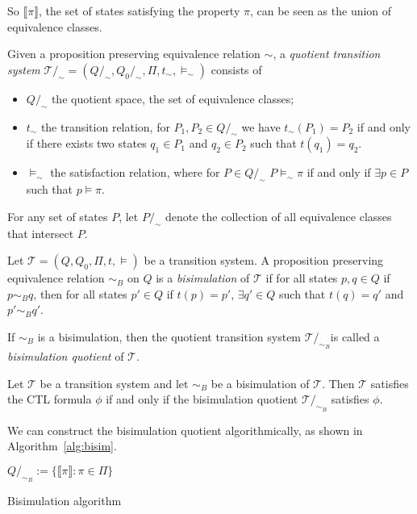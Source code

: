 So $\llbracket \pi\rrbracket$, the set of states satisfying the property $\pi$, can be seen as the union of equivalence classes.

\begin{defi}
Given a proposition preserving equivalence relation $\sim$, a \emph{quotient transition system} $\mathcal{T}/_{\sim}=(Q/_{\sim},Q_{0}/_{\sim},\Pi,t_{\sim},\models_{\sim})$ consists of
\begin{itemize}
\item{$Q/_{\sim}$ the quotient space, the set of equivalence classes;}
\item{$t_{\sim}$ the transition relation, for $P_{1},P_{2}\in Q/_{\sim}$ we have $t_{\sim}(P_{1})=P_{2}$ if and only if there exists two states $q_{1}\in P_{1}$ and $q_{2}\in P_{2}$ such that $t(q_{1})=q_{2}$.}
\item{$\models_{\sim}$ the satisfaction relation, where for $P\in Q/_{\sim}$ $P\models_{\sim}\pi$ if and only if $\exists p\in P$ such that $p\models \pi$.}
\end{itemize}
\end{defi}

For any set of states $P$, let $P/_{\sim}$ denote the collection of all equivalence classes that intersect $P$.

\begin{defi}
Let $\mathcal{T}=(Q,Q_{0},\Pi,t,\models)$ be a transition system. A proposition preserving equivalence relation $\sim_{B}$ on $Q$ is a \emph{bisimulation} of $\mathcal{T}$ if for all states $p,q\in Q$ if $p \sim_{B} q$, then for all states $p'\in Q$ if $t(p)=p'$, $\exists q'\in Q$ such that $t(q)=q'$ and $p'\sim_{B} q'$.
\end{defi}

If $\sim_{B}$ is a bisimulation, then the quotient transition system $\mathcal{T}/_{\sim_{B}}$is called a \emph{bisimulation quotient} of $\mathcal{T}$.

\begin{thm}
Let $\mathcal{T}$ be a transition system and let $\sim_{B}$ be a bisimulation of $\mathcal{T}$. Then $\mathcal{T}$ satisfies the CTL formula $\phi$ if and only if the bisimulation quotient $\mathcal{T}/_{\sim_{B}}$ satisfies $\phi$.
\end{thm}

We can construct the bisimulation quotient algorithmically, as shown in Algorithm~\ref{alg:bisim}.

\begin{algorithm}[H]
$Q/_{\sim_{B}} := \{ \llbracket \pi \rrbracket : \pi \in \Pi\}$\;
\caption{Bisimulation algorithm \cite{Bouajjani,Alur2000}}
\label{alg:bisim}
\end{algorithm}

